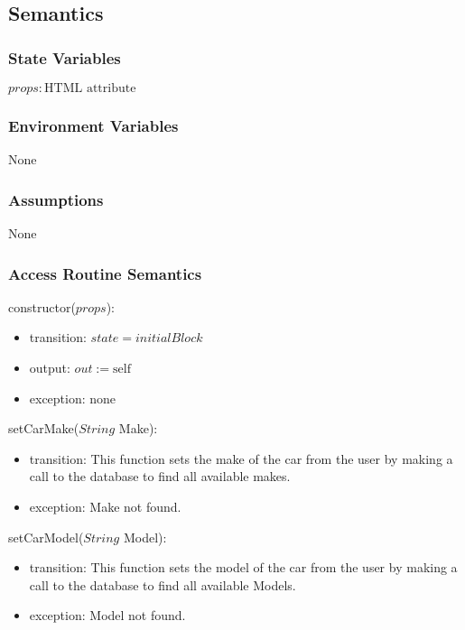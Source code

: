 \documentclass[12pt, titlepage]{article}
\begin{document}
\subsection{Semantics}

\subsubsection{State Variables}

$\mathit{props}: \text{HTML attribute}$\\

\subsubsection{Environment Variables}

None

\subsubsection{Assumptions}

None

\subsubsection{Access Routine Semantics}

\noindent constructor($props$):
\begin{itemize}
\item transition: $\mathit{state} = initialBlock$
\item output: $out := \mbox{self}$
\item exception: none
\end{itemize}

\noindent setCarMake($String$ Make):
\begin{itemize}
\item transition: This function sets the make of the car from the user by making a call to the database to find all available makes.
\item exception: Make not found.
\end{itemize}

\noindent setCarModel($String$ Model):
\begin{itemize}
\item transition: This function sets the model of the car from the user by making a call to the database to find all available Models.
\item exception: Model not found.
\end{itemize}
\end{document}
